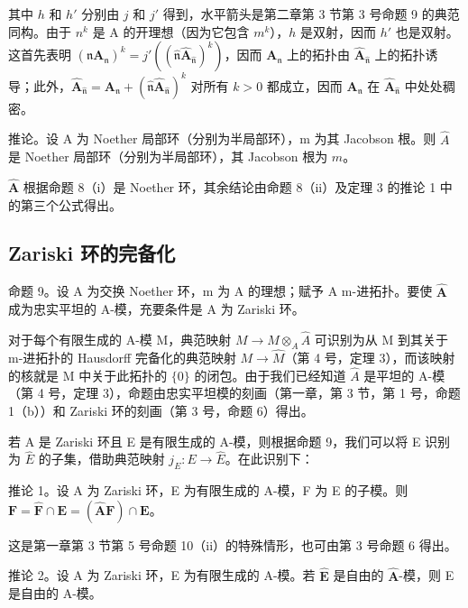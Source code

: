 其中 \(h\) 和 \(h'\) 分别由 \(j\) 和 \(j'\) 得到，水平箭头是第二章第 3 节第 3 号命题 9 的典范同构。由于 \(n^k\) 是 A 的开理想（因为它包含 \(m^k\)），\(h\) 是双射，因而 \(h'\) 也是双射。这首先表明 \((\mathfrak{n}\mathbf{A}_{\mathfrak{n}})^k = j'((\hat{\mathfrak{n}}\hat{\mathbf{A}}_{\hat{\mathfrak{n}}})^k)\)，因而 \(\mathbf{A}_{\mathfrak{n}}\) 上的拓扑由 \(\hat{\mathbf{A}}_{\hat{\mathfrak{n}}}\) 上的拓扑诱导；此外，\(\hat{\mathbf{A}}_{\hat{\mathfrak{n}}} = \mathbf{A}_{\mathfrak{n}} + (\hat{\mathfrak{n}}\hat{\mathbf{A}}_{\hat{\mathfrak{n}}})^k\) 对所有 \(k > 0\) 都成立，因而 \(\mathbf{A}_{\mathfrak{n}}\) 在 \(\hat{\mathbf{A}}_{\hat{\mathfrak{n}}}\) 中处处稠密。

推论。设 A 为 Noether 局部环（分别为半局部环），m 为其 Jacobson 根。则 \(\hat{A}\) 是 Noether 局部环（分别为半局部环），其 Jacobson 根为 \(\hat{m}\)。

\(\hat{\mathbf{A}}\) 根据命题 8（i）是 Noether 环，其余结论由命题 8（ii）及定理 3 的推论 1 中的第三个公式得出。

\subsection{Zariski 环的完备化}

命题 9。设 A 为交换 Noether 环，m 为 A 的理想；赋予 A m-进拓扑。要使 \(\hat{\mathbf{A}}\) 成为忠实平坦的 A-模，充要条件是 A 为 Zariski 环。

对于每个有限生成的 A-模 M，典范映射 \(M \to M \otimes_{A} \hat{A}\) 可识别为从 M 到其关于 m-进拓扑的 Hausdorff 完备化的典范映射 \(M \to \hat{M}\)（第 4 号，定理 3），而该映射的核就是 M 中关于此拓扑的 \(\{0\}\) 的闭包。由于我们已经知道 \(\hat{A}\) 是平坦的 A-模（第 4 号，定理 3），命题由忠实平坦模的刻画（第一章，第 3 节，第 1 号，命题 1（b））和 Zariski 环的刻画（第 3 号，命题 6）得出。

若 A 是 Zariski 环且 E 是有限生成的 A-模，则根据命题 9，我们可以将 E 识别为 \(\hat{E}\) 的子集，借助典范映射 \(j_{E}: E \to \hat{E}\)。在此识别下：

推论 1。设 A 为 Zariski 环，E 为有限生成的 A-模，F 为 E 的子模。则 \(\mathbf{F} = \hat{\mathbf{F}} \cap \mathbf{E} = (\hat{\mathbf{A}}\mathbf{F}) \cap \mathbf{E}\)。

这是第一章第 3 节第 5 号命题 10（ii）的特殊情形，也可由第 3 号命题 6 得出。

推论 2。设 A 为 Zariski 环，E 为有限生成的 A-模。若 \(\hat{\mathbf{E}}\) 是自由的 \(\hat{\mathbf{A}}\)-模，则 E 是自由的 A-模。

